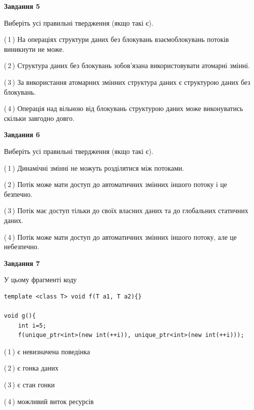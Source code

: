 \documentclass[12pt, ukrainian]{article}
\begin{document}
\begin {large}
{\begin{center}
\textbf{Завдання 5}
\end{center}

Виберіть усі правильні твердження (якщо такі є).\par
\vspace{2mm}

(\,1\,) На операціях структури даних без блокувань взаємоблокувань потоків виникнути не може.%

(\,2\,) Структура даних без блокувань зобов’язана використовувати атомарні змінні.%

(\,3\,) За використання атомарних змінних структура даних є структурою даних без блокувань.%

(\,4\,) Операція над вільною від блокувань структурою даних може виконуватись скільки завгодно довго.%
\newpage


\begin{center}
\textbf{Завдання 6}
\end{center}

Виберіть усі правильні твердження (якщо такі є).\par
\vspace{2mm}

(\,1\,) Динамічні змінні не можуть розділятися між потоками.%

(\,2\,) Потік може мати доступ до автоматичних змінних іншого потоку і це безпечно.%

(\,3\,) Потік має доступ тільки до своїх власних даних та до глобальних статичних даних.%

(\,4\,) Потік може мати доступ до автоматичних змінних іншого потоку, але це небезпечно.%


\begin{center}
\textbf{Завдання 7}
\end{center}

У цьому фрагменті коду
\begin{verbatim}
template <class T> void f(T a1, T a2){}

void g(){
    int i=5;
    f(unique_ptr<int>(new int(++i)), unique_ptr<int>(new int(++i)));
\end{verbatim}

(\,1\,) є невизначена поведінка%

(\,2\,) є гонка даних%

(\,3\,) є стан гонки%

(\,4\,) можливий виток ресурсів%

}
\end {large}

\vspace{4mm}
\newpage
\end{document}
